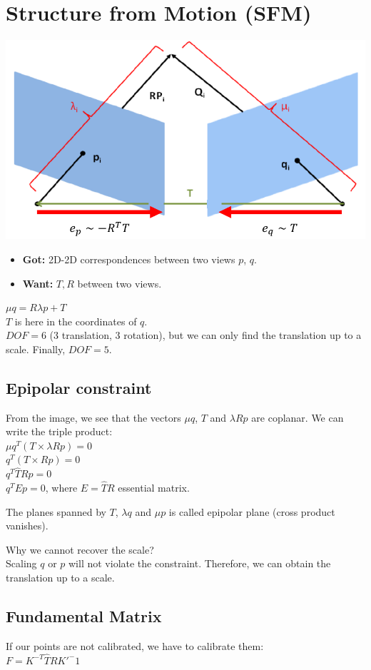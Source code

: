 \section{Structure from Motion (SFM)}
\includegraphics[width=\linewidth]{Images/SFM.png}
\begin{itemize}
  \item \textbf{Got:} 2D-2D correspondences between two views $p$, $q$.
  \item \textbf{Want:} $T, R$ between two views.
\end{itemize}
$\mu q = R \lambda p + T$\\
$T$ is here in the coordinates of $q$.\\
$DOF = 6$ (3 translation, 3 rotation), but 
we can only find the translation up to a scale. Finally, $DOF = 5$.

\subsection*{Epipolar constraint}
From the image, we see that the vectors $\mu q$, $T$ and $\lambda R p$
are coplanar. We can write the triple product:\\
$\mu q^T ( T \times \lambda R p) = 0$\\
$q^T ( T \times R p) = 0$\\
$q^T \hat{T} R p = 0$\\
$q^T E p = 0$, where $E = \hat{T} R$ essential matrix.

The planes spanned by $T$, $\lambda q$ and $\mu p$ is called epipolar
plane (cross product vanishes).

\alert{Why we cannot recover the scale?}\\
Scaling $q$ or $p$ will not violate the
constraint. Therefore, we can obtain the translation up to a scale.
\subsection*{Fundamental Matrix}
If our points are not calibrated, we have to calibrate them:\\
$F = K^{-T} \hat{T} R K'^-1$

